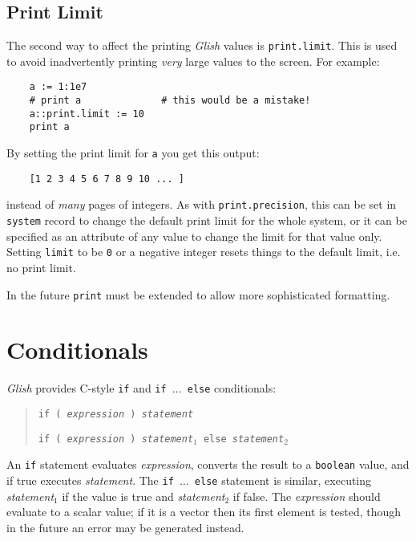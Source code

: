 \subsection{Print Limit}
\label{system-print-limit}
The second way to affect the printing {\em Glish} values 
is \verb+print.limit+. This is used to avoid inadvertently
printing {\em very} large values to the screen. For example:
\begin{verbatim}
    a := 1:1e7
    # print a              # this would be a mistake!
    a::print.limit := 10
    print a
\end{verbatim}
By setting the print limit for {\tt a} you get this output:
\begin{verbatim}
    [1 2 3 4 5 6 7 8 9 10 ... ]
\end{verbatim}
instead of {\em many} pages of integers. As with
\verb+print.precision+, this can be set in {\tt system} record to
change the default print limit for the whole system, or it can be
specified as an attribute of any value to change the limit for that
value only. Setting {\tt limit} to be {\tt 0}
or a negative integer resets things to the default limit, i.e. no print
limit.

In the future {\tt print} must be extended to allow more sophisticated
formatting.

\section{Conditionals}
\label{conditionals}

{\em Glish} provides C-style {\tt if} and {\tt if $\ldots$ else}
conditionals:
\begin{quote}
    {\tt if ( {\em expression} ) {\em statement}}

    {\tt if ( {\em expression} ) {\em statement$_1$} else {\em statement$_2$} }
\end{quote}
An {\tt if} statement evaluates {\em expression}, converts the result
to a {\tt boolean} value, and if true executes {\em statement}.
The 
{\tt if
$\ldots$ else} statement is similar, executing {\em statement$_1$} 
if the value is true
and {\em statement$_2$} if false.  The {\em expression}
should evaluate to a
scalar value; if it is a vector then its first element is tested, though
in the future an error may be generated instead.

